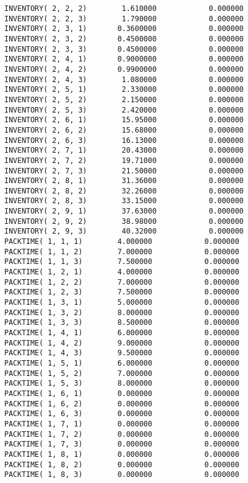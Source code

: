 \documentclass[12pt]{article}
\begin{document}
\begin{appendices}
\begin{lstlisting}
INVENTORY( 2, 2, 2)        1.610000            0.000000
INVENTORY( 2, 2, 3)        1.790000            0.000000
INVENTORY( 2, 3, 1)       0.3600000            0.000000
INVENTORY( 2, 3, 2)       0.4500000            0.000000
INVENTORY( 2, 3, 3)       0.4500000            0.000000
INVENTORY( 2, 4, 1)       0.9000000            0.000000
INVENTORY( 2, 4, 2)       0.9900000            0.000000
INVENTORY( 2, 4, 3)        1.080000            0.000000
INVENTORY( 2, 5, 1)        2.330000            0.000000
INVENTORY( 2, 5, 2)        2.150000            0.000000
INVENTORY( 2, 5, 3)        2.420000            0.000000
INVENTORY( 2, 6, 1)        15.95000            0.000000
INVENTORY( 2, 6, 2)        15.68000            0.000000
INVENTORY( 2, 6, 3)        16.13000            0.000000
INVENTORY( 2, 7, 1)        20.43000            0.000000
INVENTORY( 2, 7, 2)        19.71000            0.000000
INVENTORY( 2, 7, 3)        21.50000            0.000000
INVENTORY( 2, 8, 1)        31.36000            0.000000
INVENTORY( 2, 8, 2)        32.26000            0.000000
INVENTORY( 2, 8, 3)        33.15000            0.000000
INVENTORY( 2, 9, 1)        37.63000            0.000000
INVENTORY( 2, 9, 2)        38.98000            0.000000
INVENTORY( 2, 9, 3)        40.32000            0.000000
PACKTIME( 1, 1, 1)        4.000000            0.000000
PACKTIME( 1, 1, 2)        7.000000            0.000000
PACKTIME( 1, 1, 3)        7.500000            0.000000
PACKTIME( 1, 2, 1)        4.000000            0.000000
PACKTIME( 1, 2, 2)        7.000000            0.000000
PACKTIME( 1, 2, 3)        7.500000            0.000000
PACKTIME( 1, 3, 1)        5.000000            0.000000
PACKTIME( 1, 3, 2)        8.000000            0.000000
PACKTIME( 1, 3, 3)        8.500000            0.000000
PACKTIME( 1, 4, 1)        6.000000            0.000000
PACKTIME( 1, 4, 2)        9.000000            0.000000
PACKTIME( 1, 4, 3)        9.500000            0.000000
PACKTIME( 1, 5, 1)        6.000000            0.000000
PACKTIME( 1, 5, 2)        7.000000            0.000000
PACKTIME( 1, 5, 3)        8.000000            0.000000
PACKTIME( 1, 6, 1)        0.000000            0.000000
PACKTIME( 1, 6, 2)        0.000000            0.000000
PACKTIME( 1, 6, 3)        0.000000            0.000000
PACKTIME( 1, 7, 1)        0.000000            0.000000
PACKTIME( 1, 7, 2)        0.000000            0.000000
PACKTIME( 1, 7, 3)        0.000000            0.000000
PACKTIME( 1, 8, 1)        0.000000            0.000000
PACKTIME( 1, 8, 2)        0.000000            0.000000
PACKTIME( 1, 8, 3)        0.000000            0.000000

\end{lstlisting}
\end{appendices}
\end{document}
